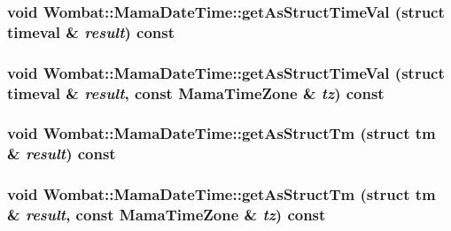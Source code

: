 \label{classWombat_1_1MamaDateTime_acfed61cbe6e7701ef883049693b6b0ae}
\hypertarget{classWombat_1_1MamaDateTime_af6c5fd2056ed4cab413d4e7c6edbac48}{
\subsubsection[{getAsStructTimeVal}]{\setlength{\rightskip}{0pt plus 5cm}void Wombat::MamaDateTime::getAsStructTimeVal (struct timeval \& {\em result}) const}}
\label{classWombat_1_1MamaDateTime_af6c5fd2056ed4cab413d4e7c6edbac48}
\hypertarget{classWombat_1_1MamaDateTime_a62a9ee319c5e3f776a9865665fc70a3c}{
\subsubsection[{getAsStructTimeVal}]{\setlength{\rightskip}{0pt plus 5cm}void Wombat::MamaDateTime::getAsStructTimeVal (struct timeval \& {\em result}, \/  const {\bf MamaTimeZone} \& {\em tz}) const}}
\label{classWombat_1_1MamaDateTime_a62a9ee319c5e3f776a9865665fc70a3c}
\hypertarget{classWombat_1_1MamaDateTime_a22e09625b13d3c551ebca057e8afa6b5}{
\subsubsection[{getAsStructTm}]{\setlength{\rightskip}{0pt plus 5cm}void Wombat::MamaDateTime::getAsStructTm (struct tm \& {\em result}) const}}
\label{classWombat_1_1MamaDateTime_a22e09625b13d3c551ebca057e8afa6b5}
\hypertarget{classWombat_1_1MamaDateTime_a4178844d857c831ead19d48df4d6ce4b}{
\subsubsection[{getAsStructTm}]{\setlength{\rightskip}{0pt plus 5cm}void Wombat::MamaDateTime::getAsStructTm (struct tm \& {\em result}, \/  const {\bf MamaTimeZone} \& {\em tz}) const}}
